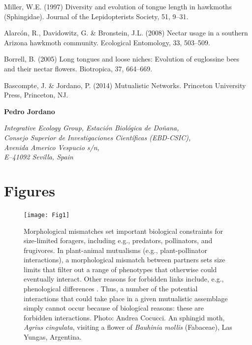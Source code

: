 \documentclass[a4paper,12pt]{article}
\begin{document}
\begin{thebibliography}{10}
Miller, W.E. (1997) Diversity and evolution of tongue length in hawkmoths (Sphingidae). Journal of the Lepidopterists Society, 51, 9–31.

Alarcón, R., Davidowitz, G. \& Bronstein, J.L. (2008) Nectar usage in a southern Arizona hawkmoth community. Ecological Entomology, 33, 503–509.

Borrell, B. (2005) Long tongues and loose niches: Evolution of euglossine bees and their nectar flowers. Biotropica, 37, 664–669.

Bascompte, J. \& Jordano, P. (2014) Mutualistic Networks. Princeton University Press, Princeton, NJ.

\end{thebibliography}


\begin{flushright}
  \noindent 
  		\textbf{Pedro Jordano }\\
  		\begin{spacing}{1.0}
		\textit{Integrative Ecology Group, Estaci\'on Biol\'ogica de Do\~nana, \\ Consejo Superior de Investigaciones Cient\'ificas (EBD-CSIC), \\ Avenida Americo Vespucio s\slash n, \\ E--41092 Sevilla, Spain}
		\end{spacing}
\end{flushright}
\newpage

\pagestyle{empty}
\section*{Figures}


\begin{figure}[h!]
  \caption{Morphological mismatches set important biological constraints for size-limited foragers, including e.g., predators, pollinators, and frugivores. In plant-animal mutualisms (e.g., plant-pollinator interactions), a morphological mismatch between partners sets size limits that filter out a range of phenotypes that otherwise could eventually interact. Other reasons for forbidden links include, e.g., phenological differences \citep{BasJor:2014}. Thus, a number of the potential interactions that could take place in a given mutualistic assemblage simply cannot occur because of biological reasons: these are forbidden interactions. Photo: Andrea Cocucci. An sphingid moth, \textit{Agrius cingulata}, visiting a flower of \textit{Bauhinia mollis} (Fabaceae), Las Yungas, Argentina.}
  \label{Fig1}
  \begin{center}
    \texttt{[image: Fig1]}
  \end{center}
\end{figure}
\end{document}
